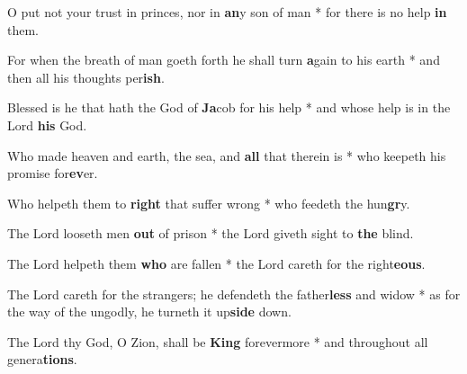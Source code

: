 \begin{multicols}{2}
	O put not your trust in princes, nor in \textbf{an}y son of man * for there is no help \textbf{in} them.
	
	For when the breath of man goeth forth he shall turn \textbf{a}gain to his earth * and then all his thoughts per\textbf{ish}.
	
	Blessed is he that hath the God of \textbf{Ja}cob for his help * and whose help is in the Lord \textbf{his} God.
	
	Who made heaven and earth, the sea, and \textbf{all} that therein is * who keepeth his promise for\textbf{ev}er.
	
	Who helpeth them to \textbf{right} that suffer wrong * who feedeth the hun\textbf{gr}y.
	
	The Lord looseth men \textbf{out} of prison * the Lord giveth sight to \textbf{the} blind.
	
	The Lord helpeth them \textbf{who} are fallen * the Lord careth for the right\textbf{eous}.
	
	The Lord careth for the strangers; he defendeth the father\textbf{less} and widow * as for the way of the ungodly, he turneth it up\textbf{side} down.
	
	The Lord thy God, O Zion, shall be \textbf{King} forevermore * and throughout all genera\textbf{tions}.
\end{multicols}